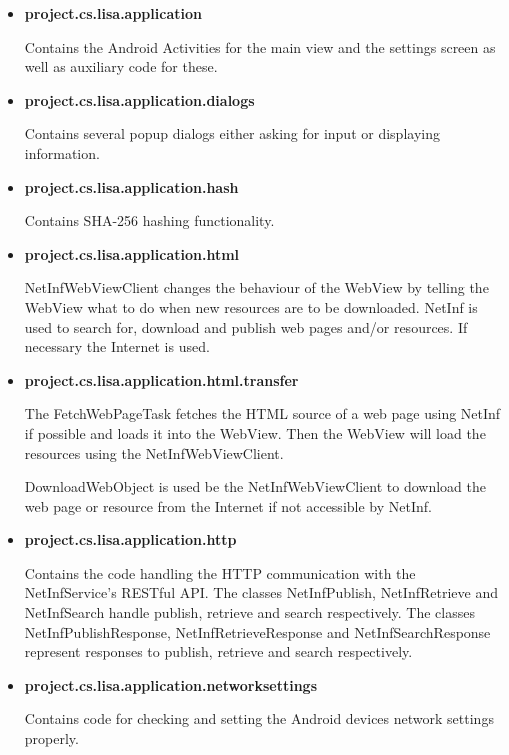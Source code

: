 \begin{itemize}
	\item{\bf project.cs.lisa.application}
	
	Contains the Android Activities for the main view and the settings screen as well as auxiliary code for these.
	
	\item{\bf project.cs.lisa.application.dialogs}

	Contains several popup dialogs either asking for input or displaying information.
	
	\item{\bf project.cs.lisa.application.hash}
	
	Contains SHA-256 hashing functionality.
	
	\item{\bf project.cs.lisa.application.html}
	
	NetInfWebViewClient changes the behaviour of the WebView by telling the WebView what to do
	when new resources are to be downloaded. NetInf is used to search for, download and publish web pages and/or resources. If necessary the Internet is used.
	
	\item{\bf project.cs.lisa.application.html.transfer}
	
	The FetchWebPageTask fetches the HTML source of a web page using NetInf if 
	possible and loads it into the WebView. Then the WebView will load the resources using the NetInfWebViewClient.
	
DownloadWebObject is used be the NetInfWebViewClient to download the web page or resource from the Internet if not accessible by NetInf.
	
	\item{\bf project.cs.lisa.application.http}
	
	Contains the code handling the HTTP communication with the NetInfService's RESTful API. The classes NetInfPublish, NetInfRetrieve and NetInfSearch handle 
	publish, retrieve and search respectively. The classes NetInfPublishResponse, NetInfRetrieveResponse and NetInfSearchResponse represent 
	responses to publish, retrieve and search respectively.
	
	\item{\bf project.cs.lisa.application.networksettings}
	
	Contains code for checking and setting the Android devices network settings properly.
	
\end{itemize}

